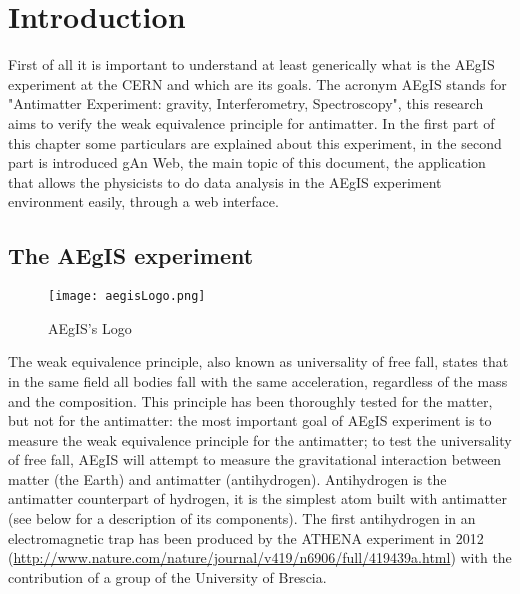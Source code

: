 
\chapter{Introduction} %

\label{Chapter1} %


First of all it is important to understand at least generically what is the AEgIS experiment at the CERN and which are its goals. The acronym AEgIS stands for "Antimatter Experiment: gravity, Interferometry, Spectroscopy", this research aims to verify the weak equivalence principle for antimatter. In the first part of this chapter some particulars are explained about this experiment, in the second part is introduced gAn Web, the main topic of this document, the application that allows the physicists to do data analysis in the AEgIS experiment environment easily, through a web interface. 

\section{The AEgIS experiment}


\begin{figure}[H]
\centering
\texttt{[image: aegisLogo.png]} 
\caption{AEgIS's Logo}
\end{figure}

The weak equivalence principle, also known as universality of free fall, states that in the same field all bodies fall with the same acceleration, regardless of the mass and the composition. This principle has been thoroughly tested for the matter, but not for the antimatter: the most important goal of AEgIS experiment is to measure the weak equivalence principle for the antimatter; to test the universality of free fall, AEgIS will attempt to measure the gravitational interaction between matter (the Earth) and antimatter (antihydrogen). Antihydrogen is the antimatter counterpart of hydrogen, it is the simplest atom built with antimatter (see below for a description of its components). The first antihydrogen in an electromagnetic trap has been produced by the ATHENA experiment in 2012 (\url{http://www.nature.com/nature/journal/v419/n6906/full/419439a.html})
with the contribution of a group of the University of Brescia.

